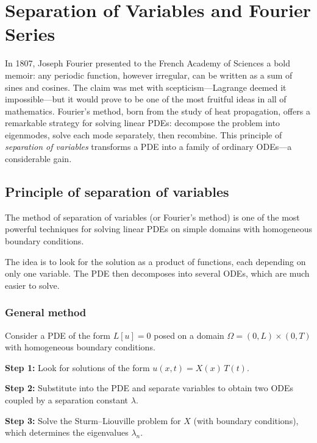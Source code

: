 \chapter{Separation of Variables and Fourier Series}
\label{ch:fourier}

In 1807, Joseph Fourier presented to the French Academy of Sciences a bold memoir: any periodic function, however irregular, can be written as a sum of sines and cosines. The claim was met with scepticism---Lagrange deemed it impossible---but it would prove to be one of the most fruitful ideas in all of mathematics. Fourier's method, born from the study of heat propagation, offers a remarkable strategy for solving linear PDEs: decompose the problem into eigenmodes, solve each mode separately, then recombine. This principle of \emph{separation of variables} transforms a PDE into a family of ordinary ODEs---a considerable gain.

\section{Principle of separation of variables}

The method of separation of variables (or Fourier's method) is one of the
most powerful techniques for solving linear PDEs on simple domains with
homogeneous boundary conditions.

\begin{intuition}
The idea is to look for the solution as a product of functions, each
depending on only one variable. The PDE then decomposes into several ODEs,
which are much easier to solve.
\end{intuition}

\subsection{General method}

Consider a PDE of the form $L[u] = 0$ posed on a domain
$\Omega = (0,L) \times (0,T)$ with homogeneous boundary conditions.

\textbf{Step 1:} Look for solutions of the form $u(x,t) = X(x)\, T(t)$.

\textbf{Step 2:} Substitute into the PDE and separate variables to obtain
two ODEs coupled by a separation constant $\lambda$.

\textbf{Step 3:} Solve the Sturm--Liouville problem for $X$ (with boundary
conditions), which determines the eigenvalues $\lambda_n$.

